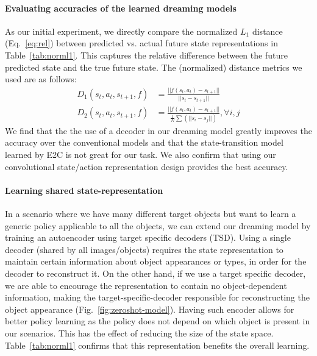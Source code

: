 \documentclass[letterpaper, 10 pt, conference]{ieeeconf}
\begin{document}
\paragraph{Evaluating accuracies of the learned dreaming models}
As our initial experiment, we directly compare the normalized $L_1$ distance (Eq.~\ref{eq:rel}) between predicted vs. actual future state representations in Table~\ref{tab:norml1}. This captures the relative difference between the future predicted state and the true future state.
The (normalized) distance metrics we used are as follows:
\begin{equation}
\begin{split}
    \label{eq:rel}
    D_1(s_t,a_t, s_{t+1}, f) &= \frac{||f(s_t, a_t) - s_{t+1}||}{||s_t - s_{t+1}||}\\
    D_2(s_t,a_t, s_{t+1}, f) &= \frac{||f(s_t, a_t) - s_{t+1}||}{\frac{1}{N}\sum(||s_i - s_j||)}, \forall i,j
    \end{split}
\end{equation}
We find that the the use of a decoder in our dreaming model greatly improves the accuracy over the conventional models and that the state-transition model learned by E2C is not great for our task. We also confirm that using our convolutional state/action representation design provides the best accuracy.

\paragraph{Learning shared state-representation} 
In a scenario where we have many different target objects but want to learn a generic policy applicable to all the objects, we can extend our dreaming model by training an autoencoder using target specific decoders (TSD).
Using a single decoder (shared by all images/objects) requires the state representation to maintain certain information about object appearances or types, in order for the decoder to reconstruct it. On the other hand, if we use a target specific decoder, we are able to encourage the representation to contain no object-dependent information, making the target-specific-decoder responsible for reconstructing the object appearance (Fig.~\ref{fig:zeroshot-model}). Having such encoder allows for better policy learning as the policy does not depend on which object is present in our scenarios. This has the effect of reducing the size of the state space. Table~\ref{tab:norml1} confirms that this representation benefits the overall learning.
\end{document}
